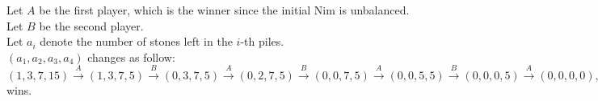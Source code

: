 \begin{pr}
Let $A$ be the first player, which is the winner since the initial Nim is unbalanced.\\
Let $B$ be the second player.\\
Let $a_i$ denote the number of stones left in the $i$-th piles.\\
$(a_1, a_2, a_3, a_4)$ changes as follow:\\
$(1, 3, 7, 15)\overset A\to(1, 3, 7, 5)\overset B\to(0, 3, 7, 5)\overset A\to(0, 2, 7, 5)\overset B\to(0, 0, 7, 5)\overset A\to(0, 0, 5, 5)\overset B\to(0, 0, 0, 5)\overset A\to(0, 0, 0, 0), A$ wins.
\end{pr}
